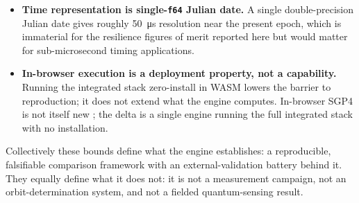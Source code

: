 \begin{itemize}
  \item \textbf{Time representation is single-\texttt{f64} Julian date.} A single
  double-precision Julian date gives roughly \SI{50}{\micro\second} resolution near
  the present epoch, which is immaterial for the resilience figures of merit reported
  here but would matter for sub-microsecond timing applications.

  \item \textbf{In-browser execution is a deployment property, not a capability.}
  Running the integrated stack zero-install in WASM lowers the barrier to
  reproduction; it does not extend what the engine computes. In-browser SGP4 is not
  itself new \citep{satellitejs}; the delta is a single engine running the full
  integrated stack with no installation.

\end{itemize}

\noindent Collectively these bounds define what the engine establishes: a
reproducible, falsifiable comparison framework with an external-validation battery
behind it. They equally define what it does not: it is not a measurement
campaign, not an orbit-determination system, and not a fielded quantum-sensing
result.
